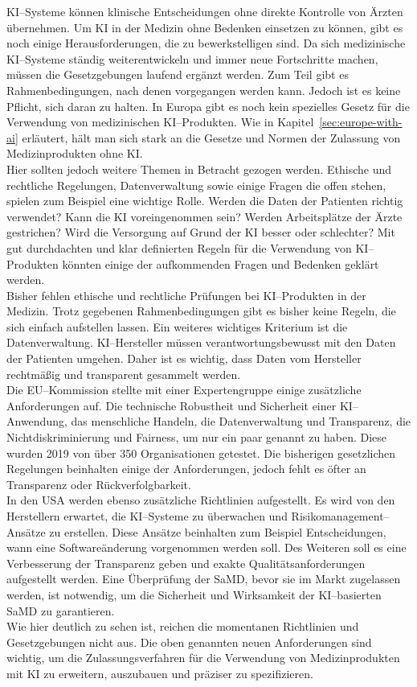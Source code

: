 KI--Systeme können klinische Entscheidungen ohne direkte Kontrolle von Ärzten übernehmen.\cite{Lessons_Learned_about_ai}
Um KI in der Medizin ohne Bedenken einsetzen zu können, gibt es noch einige Herausforderungen, die zu bewerkstelligen sind. 
Da sich medizinische KI--Systeme ständig weiterentwickeln und immer neue Fortschritte machen, 
müssen die Gesetzgebungen laufend ergänzt werden. 
Zum Teil gibt es Rahmenbedingungen, nach denen vorgegangen werden kann. 
Jedoch ist es keine Pflicht, sich daran zu halten.
In Europa gibt es noch kein spezielles Gesetz für die Verwendung von medizinischen KI--Produkten. 
Wie in Kapitel~\ref{sec:europe-with-ai} erläutert, 
hält man sich stark an die Gesetze und Normen der Zulassung von Medizinprodukten ohne KI.\\ 
Hier sollten jedoch weitere Themen in Betracht gezogen werden. Ethische und rechtliche Regelungen, Datenverwaltung sowie einige Fragen die offen stehen, 
spielen zum Beispiel eine wichtige Rolle. 
Werden die Daten der Patienten richtig verwendet? Kann die KI voreingenommen sein?
Werden Arbeitsplätze der Ärzte gestrichen? 
Wird die Versorgung auf Grund der KI besser oder schlechter? 
Mit gut durchdachten und klar definierten Regeln für die Verwendung von KI--Produkten könnten einige
der aufkommenden Fragen und Bedenken geklärt werden.\\
Bisher fehlen ethische und rechtliche Prüfungen bei KI--Produkten in der Medizin. 
Trotz gegebenen Rahmenbedingungen gibt es bisher keine Regeln, die sich einfach aufstellen lassen. 
Ein weiteres wichtiges Kriterium ist die Datenverwaltung. 
KI--Hersteller müssen verantwortungsbewusst mit den Daten der Patienten umgehen. 
Daher ist es wichtig, dass Daten vom Hersteller rechtmäßig und transparent gesammelt werden.\cite{Lessons_Learned_about_ai}\\
Die EU--Kommission stellte mit einer Expertengruppe einige zusätzliche Anforderungen auf. 
Die technische Robustheit und Sicherheit einer KI--Anwendung, das menschliche Handeln, 
die Datenverwaltung und Transparenz, die Nichtdiskriminierung und Fairness, 
um nur ein paar genannt zu haben. 
Diese wurden 2019 von über 350 Organisationen getestet. 
Die bisherigen gesetzlichen Regelungen beinhalten einige der Anforderungen, 
jedoch fehlt es öfter an Transparenz oder Rückverfolgbarkeit.\cite{whitepaper}\\
In den USA werden ebenso zusätzliche Richtlinien aufgestellt.
Es wird von den Herstellern erwartet, 
die KI--Systeme zu überwachen und Risikomanagement--Ansätze zu erstellen. 
Diese Ansätze beinhalten zum Beispiel Entscheidungen, 
wann eine Softwareänderung vorgenommen werden soll. 
Des Weiteren soll es eine Verbesserung der Transparenz geben 
und exakte Qualitätsanforderungen aufgestellt werden. Eine Überprüfung der SaMD,
bevor sie im Markt zugelassen werden, ist notwendig, 
um die Sicherheit und Wirksamkeit der KI--basierten SaMD zu garantieren.\cite{fda_original}\\
Wie hier deutlich zu sehen ist,
reichen die momentanen Richtlinien und Gesetzgebungen nicht aus. 
Die oben genannten neuen Anforderungen sind wichtig, 
um die Zulassungsverfahren für die Verwendung von Medizinprodukten mit KI zu erweitern,
auszubauen und präziser zu spezifizieren.